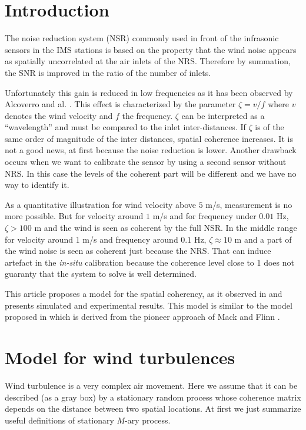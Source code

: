 \section{Introduction}
The noise reduction system (NSR) commonly used in front of the infrasonic sensors in the IMS stations is based on the property that the wind noise appears as spatially uncorrelated at the air inlets of the NRS. Therefore by summation, the SNR is improved in the ratio of the number of inlets. 

Unfortunately this gain is reduced in low frequencies as it has been observed by Alcoverro and al. \cite{alcoverro:2005}. This effect is characterized by the parameter $\zeta=v/f$ where $v$ denotes the wind velocity and $f$ the frequency. $\zeta$ can be interpreted as a ``wavelength'' and must be compared to the inlet inter-distances. If $\zeta$ is of the same order of magnitude of the inter distances, spatial coherence increases. It is not a good news, at first because the noise reduction  is lower. Another drawback occurs when we want to calibrate the sensor by using a second sensor without NRS. In this case the levels of the coherent part will be different and we have no way to identify it.

As a quantitative illustration for wind velocity above $5$ m/s, measurement is no more possible. But for velocity around $1$ m/s and for frequency under $0.01$ Hz, $\zeta>100$ m and the wind is seen as coherent by the full NSR. In the middle range for velocity around $1$ m/s and frequency around $0.1$ Hz, $\zeta\approx 10$ m and a part of the wind noise is seen as coherent just because the NRS. That can induce artefact in the {\it in-situ} calibration because the coherence level close to 1 does not guaranty that the system to solve is well determined.


This article proposes a model for the spatial coherency, as it observed in \cite{alcoverro:2005} and presents simulated and experimental results. This model is similar to the model proposed in \cite{nouvellet_itwb:2013} which is derived from the pioneer approach of Mack and Flinn \cite{mack_flinn:1971}.

\section{Model for wind turbulences}
Wind turbulence is a very complex air movement. Here we assume that it can be described (as a gray box) by a stationary random  process whose coherence matrix depends on the distance between two spatial locations. At first we just summarize useful definitions of stationary $M$-ary process.

